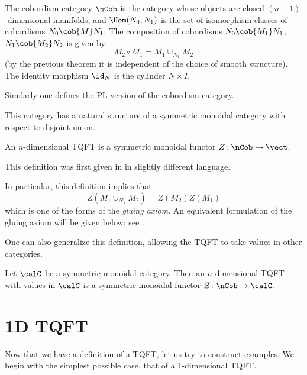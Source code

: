 \begin{definition}\label{d:ncob}
  The cobordism category $\nCob$ is the category whose objects are closed
  $(n-1)$-dimensional manifolds, and $\Hom(N_0, N_1)$ is the set of
  isomorphism classes of cobordisms $N_0\cob{M}N_1$. The composition of
  cobordisms $N_0\cob{M_1}N_1$, $N_1\cob{M_2}N_2$
  is given by
  $$
    M_2\circ M_1 = M_1\cup_{N_1} M_2
  $$
  (by the previous theorem it is independent of the choice of smooth structure).
  The identity morphism $\id_N$ is the cylinder $N\times I$.
\end{definition}
Similarly one defines the PL version of the cobordism category.

This category has a natural structure of a symmetric monoidal
category with respect to disjoint union.

\begin{definition}\label{d:tqft}
  An $n$-dimensional TQFT is a symmetric
  monoidal functor $Z\colon \nCob\to \vect$.
\end{definition}
This definition was first given in \cite{atiyah} in slightly different
language.

In particular, this definition implies that
\begin{equation}\label{e:tqft-gluing0}
  Z( M_1\cup_{N_1} M_2) = Z(M_2) Z(M_1)
\end{equation}
which is one of the forms of the \emph{gluing axiom}.
An equivalent formulation of the gluing axiom will be given below; see
.


One can also generalize this definition, allowing the TQFT to take values in
other categories.

\begin{definition}\label{d:tqft-c}
  Let $\calC$ be a symmetric monoidal category. Then an
  $n$-dimensional TQFT with values in $\calC$ is a symmetric
    monoidal functor $Z\colon \nCob\to \calC$.
\end{definition}
\section{1D TQFT}\label{s:1d-tqft}

Now that we have a definition of a TQFT, let us try to construct examples. We
begin with the simplest possible case, that of a 1-dimensional TQFT.

